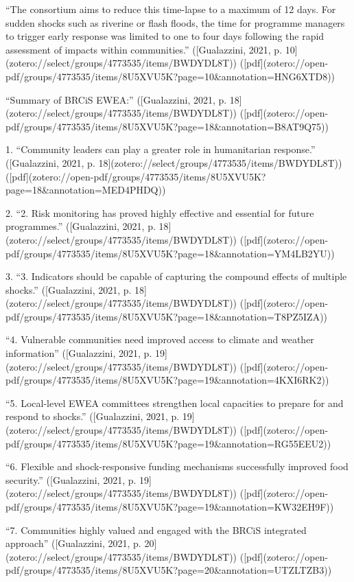 {“The consortium aims to reduce this time-lapse to a maximum of 12 days. For sudden shocks such as riverine or flash floods, the time for programme managers to trigger early response was limited to one to four days following the rapid assessment of impacts within communities.” ([Gualazzini, 2021, p. 10](zotero://select/groups/4773535/items/BWDYDL8T)) ([pdf](zotero://open-pdf/groups/4773535/items/8U5XVU5K?page=10&annotation=HNG6XTD8))


“Summary of BRCiS EWEA:” ([Gualazzini, 2021, p. 18](zotero://select/groups/4773535/items/BWDYDL8T)) ([pdf](zotero://open-pdf/groups/4773535/items/8U5XVU5K?page=18&annotation=B8AT9Q75))

1. “Community leaders can play a greater role in humanitarian response.” ([Gualazzini, 2021, p. 18](zotero://select/groups/4773535/items/BWDYDL8T)) ([pdf](zotero://open-pdf/groups/4773535/items/8U5XVU5K?page=18&annotation=MED4PHDQ))

2. “2. Risk monitoring has proved highly effective and essential for future programmes.” ([Gualazzini, 2021, p. 18](zotero://select/groups/4773535/items/BWDYDL8T)) ([pdf](zotero://open-pdf/groups/4773535/items/8U5XVU5K?page=18&annotation=YM4LB2YU))


3. “3. Indicators should be capable of capturing the compound effects of multiple shocks.” ([Gualazzini, 2021, p. 18](zotero://select/groups/4773535/items/BWDYDL8T)) ([pdf](zotero://open-pdf/groups/4773535/items/8U5XVU5K?page=18&annotation=T8PZ5IZA))

“4. Vulnerable communities need improved access to climate and weather information” ([Gualazzini, 2021, p. 19](zotero://select/groups/4773535/items/BWDYDL8T)) ([pdf](zotero://open-pdf/groups/4773535/items/8U5XVU5K?page=19&annotation=4KXI6RK2))

“5. Local-level EWEA committees strengthen local capacities to prepare for and respond to shocks.” ([Gualazzini, 2021, p. 19](zotero://select/groups/4773535/items/BWDYDL8T)) ([pdf](zotero://open-pdf/groups/4773535/items/8U5XVU5K?page=19&annotation=RG55EEU2))

“6. Flexible and shock-responsive funding mechanisms successfully improved food security.” ([Gualazzini, 2021, p. 19](zotero://select/groups/4773535/items/BWDYDL8T)) ([pdf](zotero://open-pdf/groups/4773535/items/8U5XVU5K?page=19&annotation=KW32EH9F))

“7. Communities highly valued and engaged with the BRCiS integrated approach” ([Gualazzini, 2021, p. 20](zotero://select/groups/4773535/items/BWDYDL8T)) ([pdf](zotero://open-pdf/groups/4773535/items/8U5XVU5K?page=20&annotation=UTZLTZB3))

}

